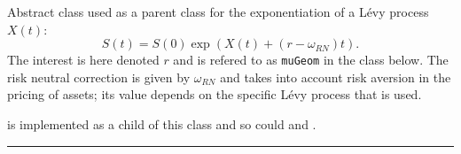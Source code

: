 
Abstract class used as a parent class for the exponentiation
of a L\'evy process $X(t)$:
\begin{equation}
S(t) = S(0) \exp\left(X(t) + (r - \omega_{RN}) t\right).
\end{equation}
The interest is here denoted $r$ and is refered to
as \texttt{muGeom} in the class below.
The risk neutral correction is given by $\omega_{RN}$
and takes into account risk aversion in the pricing of
assets; its value depends on the specific L\'evy process
that is used.

 is
implemented as a child of this class
and so could 
and .


\bigskip\hrule\bigskip

